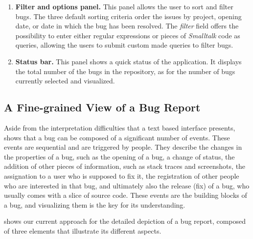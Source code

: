 \begin{enumerate}
\item {\bf Filter and options panel.} This panel allows the user to sort and filter bugs. The three default sorting criteria order the issues by project, opening date, or date in which the bug has been resolved. The \textit{filter} field offers the possibility to enter either regular expressions or pieces of {\em Smalltalk} code as queries, allowing the users to submit custom made queries to filter bugs.

\item\textbf{Status bar.} This panel shows a quick status of the application. It displays the total number of the bugs in the repository, as for the number of bugs currently selected and visualized.

\end{enumerate}

\subsection{A Fine-grained View of a Bug Report} \label{inbug-detail}

Aside from the interpretation difficulties that a text based interface presents,  shows that a bug can be composed of a significant number of events. These events are sequential and are triggered by people. They describe the changes in the properties of a bug, such as the opening of a bug, a change of status, the addition of other pieces of information, such as stack traces and screenshots, the assignation to a user who is supposed to fix it, the registration of other people who are interested in that bug, and ultimately also the release (fix) of a bug, who usually comes with a slice of source code. These events are the building blocks of a bug, and visualizing them is the key for its understanding.

 shows our current approach for the detailed depiction of a bug report, composed of three elements that illustrate its different aspects.

